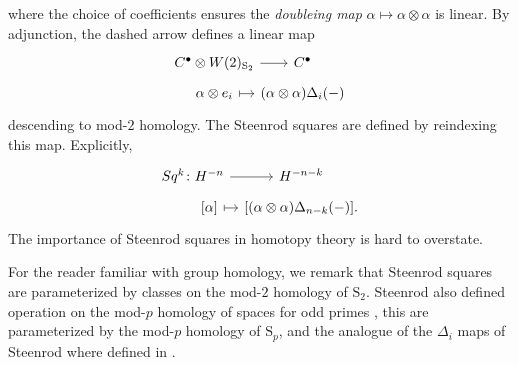 where the choice of coefficients ensures the \textit{doubleing map} $\alpha \mapsto \alpha \otimes \alpha$ is linear.
By adjunction, the dashed arrow defines a linear map
\begin{equation*}
\begin{tikzcd}[row sep=tiny, column sep = tiny]
C^\bullet \otimes W(2)_{\mathrm S_2} \arrow[r] &[-10pt] C^\bullet \\
\alpha \otimes e_i \arrow[r, |->] & (\alpha \otimes \alpha)\Delta_i(-)
\end{tikzcd}
\end{equation*}
descending to mod-$2$ homology. The Steenrod squares are defined by reindexing this map. Explicitly,
\begin{equation*}
\begin{tikzcd}[row sep=tiny, column sep=tiny]
Sq^k \colon H^{-n} \arrow[r] & H^{-n-k} \\
\phantom{Sq^k \colon}{[\alpha]} \arrow[r, |->] & {\left[(\alpha \otimes \alpha)\Delta_{n-k}(-) \right]}.
\end{tikzcd}
\end{equation*}
The importance of Steenrod squares in homotopy theory is hard to overstate.

\begin{remark}
	For the reader familiar with group homology, we remark that Steenrod squares are parameterized by classes on the mod-$2$ homology of $\mathrm S_2$.
	Steenrod also defined operation on the mod-$p$ homology of spaces for odd primes \cite{}, this are parameterized by the mod-$p$ homology of $\mathrm S_p$, and the analogue of the $\Delta_i$ maps of Steenrod where defined in \cite{medina2020odd}.
\end{remark}